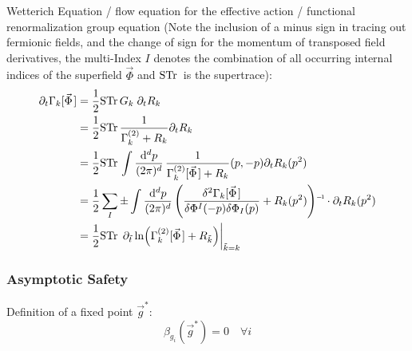 			\noindent
			Wetterich Equation / flow equation for the effective action / functional renormalization group equation (Note the inclusion of a minus sign in tracing out fermionic fields, and the change of sign for the momentum of transposed field derivatives, the multi-Index $I$ denotes the combination of all occurring internal indices of the superfield $\vec{\Phi}$ and $\mathrm{STr}\,$ is the supertrace):
			\begin{equation}
				\begin{aligned}
					\partial_t \Gamma_k[\vec{\Phi}]
					&= \frac{1}{2} \STr G_k \;\partial_t R_k \\
					&= \frac{1}{2} \STr \frac{1}{\Gamma^{(2)}_k + R_k} \partial_t R_k \\
					&= \frac{1}{2} \STr \int \frac{\dd^d p}{(2\pi)^d} \, \frac{1}{\Gamma^{(2)}_k[\vec{\Phi}] + R_k}(p,-p) \partial_t R_k(p^2) \\
					&= \frac{1}{2} \sum_I \pm \int \frac{\dd^d p}{(2\pi)^d} \, \inv{\qty(\frac{\delta^2 \Gamma_k[\vec{\Phi}]}{\delta \Phi^I(-p) \delta \Phi_I(p)} + R_k(p^2))} \cdot \partial_t R_k(p^2) \\
					&= \frac{1}{2} \STr \eval{\partial_{\tilde{t}} \ln(\Gamma^{(2)}_k[\vec{\Phi}] + R_{\tilde{k}})}_{\tilde{k} = k}
				\end{aligned}
			\end{equation}

		\subsubsection{Asymptotic Safety}
			\noindent
			Definition of a fixed point $\vec{g}^{*}$:
			\begin{equation}
				\beta_{g_i}(\vec{g}^{*}) = 0 \quad \forall i
			\end{equation}

